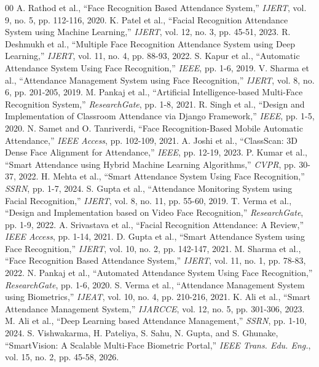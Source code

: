 \documentclass[10pt,journal,compsoc,twocolumn,a4paper]{IEEEtran}
\begin{document}
\begin{thebibliography}{00}
\small
{} A. Rathod et al., ``Face Recognition Based Attendance System,'' \textit{IJERT}, vol. 9, no. 5, pp. 112-116, 2020.
 K. Patel et al., ``Facial Recognition Attendance System using Machine Learning,'' \textit{IJERT}, vol. 12, no. 3, pp. 45-51, 2023.
 R. Deshmukh et al., ``Multiple Face Recognition Attendance System using Deep Learning,'' \textit{IJERT}, vol. 11, no. 4, pp. 88-93, 2022.
 S. Kapur et al., ``Automatic Attendance System Using Face Recognition,'' \textit{IEEE}, pp. 1-6, 2019.
 V. Sharma et al., ``Attendance Management System using Face Recognition,'' \textit{IJERT}, vol. 8, no. 6, pp. 201-205, 2019.
 M. Pankaj et al., ``Artificial Intelligence-based Multi-Face Recognition System,'' \textit{ResearchGate}, pp. 1-8, 2021.
 R. Singh et al., ``Design and Implementation of Classroom Attendance via Django Framework,'' \textit{IEEE}, pp. 1-5, 2020.
 N. Samet and O. Tanriverdi, ``Face Recognition-Based Mobile Automatic Attendance,'' \textit{IEEE Access}, pp. 102-109, 2021.
 A. Joshi et al., ``ClassScan: 3D Dense Face Alignment for Attendance,'' \textit{IEEE}, pp. 12-19, 2023.
 P. Kumar et al., ``Smart Attendance using Hybrid Machine Learning Algorithms,'' \textit{CVPR}, pp. 30-37, 2022.
 H. Mehta et al., ``Smart Attendance System Using Face Recognition,'' \textit{SSRN}, pp. 1-7, 2024.
 S. Gupta et al., ``Attendance Monitoring System using Facial Recognition,'' \textit{IJERT}, vol. 8, no. 11, pp. 55-60, 2019.
 T. Verma et al., ``Design and Implementation based on Video Face Recognition,'' \textit{ResearchGate}, pp. 1-9, 2022.
 A. Srivastava et al., ``Facial Recognition Attendance: A Review,'' \textit{IEEE Access}, pp. 1-14, 2021.
 D. Gupta et al., ``Smart Attendance System using Face Recognition,'' \textit{IJERT}, vol. 10, no. 2, pp. 142-147, 2021.
 M. Sharma et al., ``Face Recognition Based Attendance System,'' \textit{IJERT}, vol. 11, no. 1, pp. 78-83, 2022.
 N. Pankaj et al., ``Automated Attendance System Using Face Recognition,'' \textit{ResearchGate}, pp. 1-6, 2020.
 S. Verma et al., ``Attendance Management System using Biometrics,'' \textit{IJEAT}, vol. 10, no. 4, pp. 210-216, 2021.
 K. Ali et al., ``Smart Attendance Management System,'' \textit{IJARCCE}, vol. 12, no. 5, pp. 301-306, 2023.
 M. Ali et al., ``Deep Learning based Attendance Management,'' \textit{SSRN}, pp. 1-10, 2024.
 S. Vishwakarma, H. Pateliya, S. Sahu, N. Gupta, and S. Ghunake, ``SmartVision: A Scalable Multi-Face Biometric Portal,'' \textit{IEEE Trans. Edu. Eng.}, vol. 15, no. 2, pp. 45-58, 2026.
\end{thebibliography}
\end{document}
